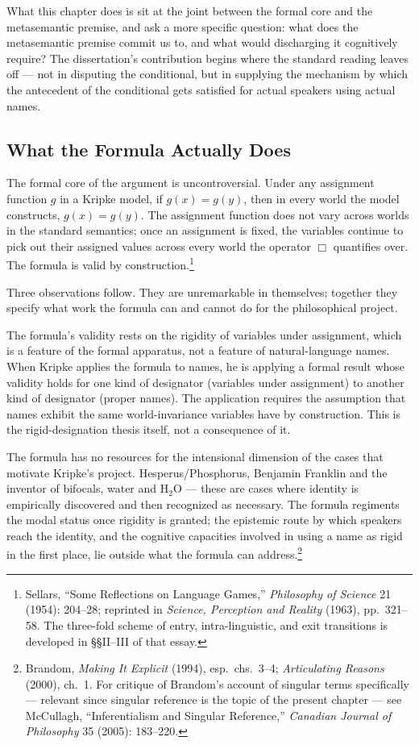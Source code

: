 \documentclass[12pt,a4paper]{article}
\begin{document}
What this chapter does is sit at the joint between the formal core and the metasemantic premise, and ask a more specific question: what does the metasemantic premise commit us to, and what would discharging it cognitively require? The dissertation's contribution begins where the standard reading leaves off --- not in disputing the conditional, but in supplying the mechanism by which the antecedent of the conditional gets satisfied for actual speakers using actual names.

\subsection{What the Formula Actually Does}\label{what-the-formula-actually-does}

The formal core of the argument is uncontroversial. Under any assignment function \(g\) in a Kripke model, if \(g(x) = g(y)\), then in every world the model constructs, \(g(x) = g(y)\). The assignment function does not vary across worlds in the standard semantics; once an assignment is fixed, the variables continue to pick out their assigned values across every world the operator \(\Box\) quantifies over. The formula is valid by construction.\footnote{Sellars, ``Some Reflections on Language Games,'' \emph{Philosophy of Science} 21 (1954): 204--28; reprinted in \emph{Science, Perception and Reality} (1963), pp.~321--58. The three-fold scheme of entry, intra-linguistic, and exit transitions is developed in §§II--III of that essay.}

Three observations follow. They are unremarkable in themselves; together they specify what work the formula can and cannot do for the philosophical project.

The formula's validity rests on the rigidity of variables under assignment, which is a feature of the formal apparatus, not a feature of natural-language names. When Kripke applies the formula to names, he is applying a formal result whose validity holds for one kind of designator (variables under assignment) to another kind of designator (proper names). The application requires the assumption that names exhibit the same world-invariance variables have by construction. This is the rigid-designation thesis itself, not a consequence of it.

The formula has no resources for the intensional dimension of the cases that motivate Kripke's project. Hesperus/Phosphorus, Benjamin Franklin and the inventor of bifocals, water and H\(_2\)O --- these are cases where identity is empirically discovered and then recognized as necessary. The formula regiments the modal status once rigidity is granted; the epistemic route by which speakers reach the identity, and the cognitive capacities involved in using a name as rigid in the first place, lie outside what the formula can address.\footnote{Brandom, \emph{Making It Explicit} (1994), esp.~chs.~3--4; \emph{Articulating Reasons} (2000), ch.~1. For critique of Brandom's account of singular terms specifically --- relevant since singular reference is the topic of the present chapter --- see McCullagh, ``Inferentialism and Singular Reference,'' \emph{Canadian Journal of Philosophy} 35 (2005): 183--220.}
\end{document}
